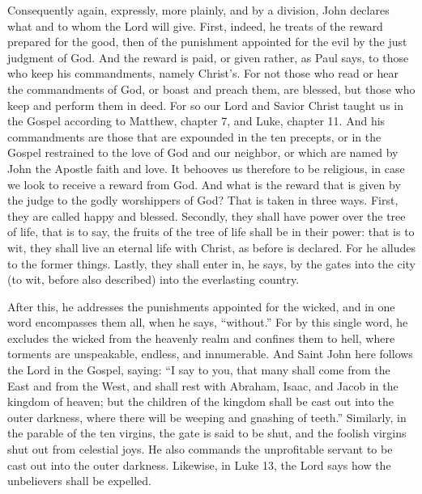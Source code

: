 Consequently again, expressly, more plainly, and by a division, John declares what and to whom the Lord will give. First, indeed, he treats of the reward prepared for the good, then of the punishment appointed for the evil by the just judgment of God. And the reward is paid, or given rather, as Paul says, to those who keep his commandments, namely Christ’s. For not those who read or hear the commandments of God, or boast and preach them, are blessed, but those who keep and perform them in deed. For so our Lord and Savior Christ taught us in the Gospel according to Matthew, chapter 7, and Luke, chapter 11. And his commandments are those that are expounded in the ten precepts, or in the Gospel restrained to the love of God and our neighbor, or which are named by John the Apostle faith and love. It behooves us therefore to be religious, in case we look to receive a reward from God. And what is the reward that is given by the judge to the godly worshippers of God? That is taken in three ways. First, they are called happy and blessed. Secondly, they shall have power over the tree of life, that is to say, the fruits of the tree of life shall be in their power: that is to wit, they shall live an eternal life with Christ, as before is declared. For he alludes to the former things. Lastly, they shall enter in, he says, by the gates into the city (to wit, before also described) into the everlasting country.

After this, he addresses the punishments appointed for the wicked, and in one word encompasses them all, when he says, “without.” For by this single word, he excludes the wicked from the heavenly realm and confines them to hell, where torments are unspeakable, endless, and innumerable. And Saint John here follows the Lord in the Gospel, saying: “I say to you, that many shall come from the East and from the West, and shall rest with Abraham, Isaac, and Jacob in the kingdom of heaven; but the children of the kingdom shall be cast out into the outer darkness, where there will be weeping and gnashing of teeth.” Similarly, in the parable of the ten virgins, the gate is said to be shut, and the foolish virgins shut out from celestial joys. He also commands the unprofitable servant to be cast out into the outer darkness. Likewise, in Luke 13, the Lord says how the unbelievers shall be expelled.

